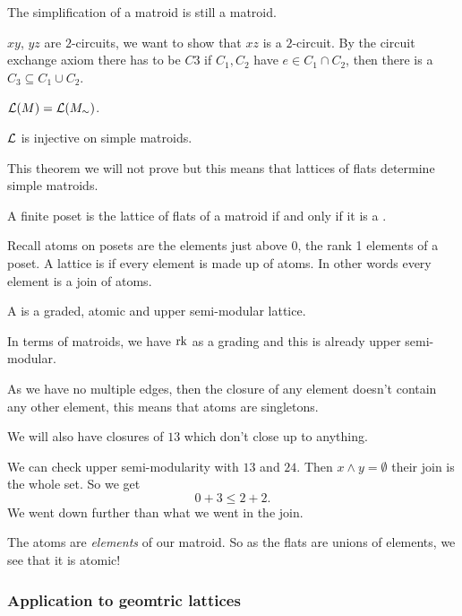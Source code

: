 \documentclass[12pt]{memoir}
\begin{document}
\begin{Ex}
    The simplification of a matroid is still a matroid.
\end{Ex}

$xy$, $yz$ are $2$-circuits, we want to show that $xz$ is a $2$-circuit. By the circuit exchange axiom there has to be $C3$ if $C_1,C_2$ have $e\in C_1\cap C_2$, then there is a $C_3\subseteq C_1\cup C_2$.

\begin{Lem}
    $\mathcal{L}(M)=\mathcal{L}(M_\sim)$.
\end{Lem}

\begin{Th}
$\mathcal{L}$ is injective on simple matroids.
\end{Th}

This theorem we will not prove but this means that lattices of flats determine simple matroids. 

\begin{Th}
    A finite poset is the lattice of flats of a matroid if and only if it is a .
\end{Th}

Recall atoms on posets are the elements just above $0$, the rank 1 elements of a poset. A lattice is  if every element is made up of atoms. In other words every element is a join of atoms.

\begin{Def}
    A  is a graded, atomic and upper semi-modular lattice.
\end{Def}

In terms of matroids, we have $\operatorname{rk}$ as a grading and this is already upper semi-modular. 


 \begin{Ex}
    As we have no multiple edges, then the closure of any element doesn't contain any other element, this means that atoms are singletons.\par 
    We will also have closures of $13$ which don't close up to anything.\par 
    We can check upper semi-modularity with $13$ and $24$. Then $x\land y=\emptyset$ their join is the whole set. So we get 
    $$0+3\leq 2+2.$$
    We went down further than what we went in the join.
 \end{Ex}
 The atoms are \emph{elements} of our matroid. So as the flats are unions of elements, we see that it is atomic!

 \subsubsection{Application to geomtric lattices}
\end{document}
